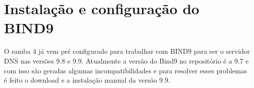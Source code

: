 
\section{Instalação e configuração do BIND9}

O samba 4 já vem pré configurado para trabalhar com BIND9 para ser o servidor DNS nas versões 9.8 e 9.9.
Atualmente a versão do Bind9 no repositório é a 9.7 e com isso são geradas algumas incompatibilidades e para resolver esses problemas é feito o download e a instalação manual da versão 9.9.


